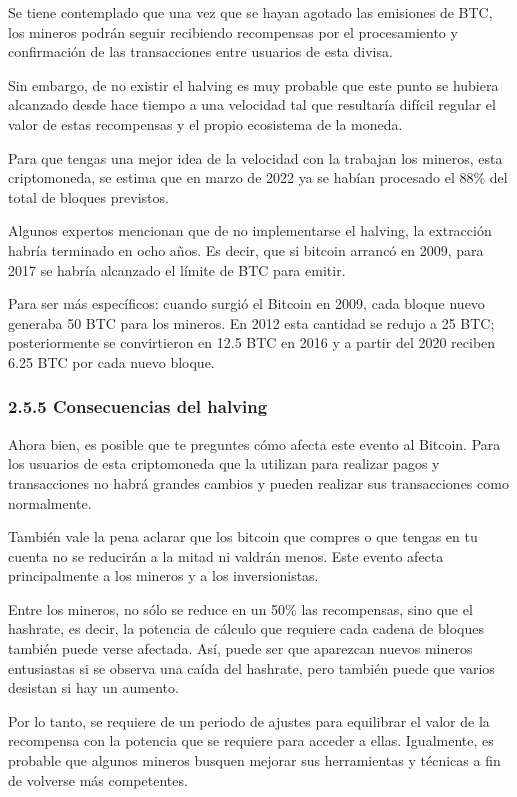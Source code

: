\documentclass[12pt,a4paper]{article}
\begin{document}
Se tiene contemplado que una vez que se hayan agotado las emisiones de BTC, los
mineros podrán seguir recibiendo recompensas por el procesamiento y confirmación de las
transacciones entre usuarios de esta divisa.

Sin embargo, de no existir el halving es muy probable que este punto se hubiera alcanzado
desde hace tiempo a una velocidad tal que resultaría difícil regular el valor de estas
recompensas y el propio ecosistema de la moneda.

Para que tengas una mejor idea de la velocidad con la trabajan los mineros, esta
criptomoneda, se estima que en marzo de 2022 ya se habían procesado el 88\% del total de
bloques previstos.

Algunos expertos mencionan que de no implementarse el halving, la extracción habría
terminado en ocho años. Es decir, que si bitcoin arrancó en 2009, para 2017 se habría
alcanzado el límite de BTC para emitir.

Para ser más específicos: cuando surgió el Bitcoin en 2009, cada bloque nuevo generaba
50 BTC para los mineros. En 2012 esta cantidad se redujo a 25 BTC; posteriormente se
convirtieron en 12.5 BTC en 2016 y a partir del 2020 reciben 6.25 BTC por cada nuevo
bloque.


\subsubsection*{2.5.5 Consecuencias del halving}

Ahora bien, es posible que te preguntes cómo afecta este evento al Bitcoin. Para los usuarios de esta criptomoneda que la utilizan para realizar pagos y transacciones no habrá grandes cambios y pueden realizar sus transacciones como normalmente.

También vale la pena aclarar que los bitcoin que compres o que tengas en tu cuenta no se reducirán a la mitad ni valdrán menos. Este evento afecta principalmente a los mineros y a los inversionistas.

Entre los mineros, no sólo se reduce en un 50\% las recompensas, sino que el hashrate, es decir, la potencia de cálculo que requiere cada cadena de bloques también puede verse afectada. Así, puede ser que aparezcan nuevos mineros entusiastas si se observa una caída del hashrate, pero también puede que varios desistan si hay un aumento.

Por lo tanto, se requiere de un periodo de ajustes para equilibrar el valor de la recompensa con la potencia que se requiere para acceder a ellas. Igualmente, es probable que algunos mineros busquen mejorar sus herramientas y técnicas a fin de volverse más competentes.
\end{document}
